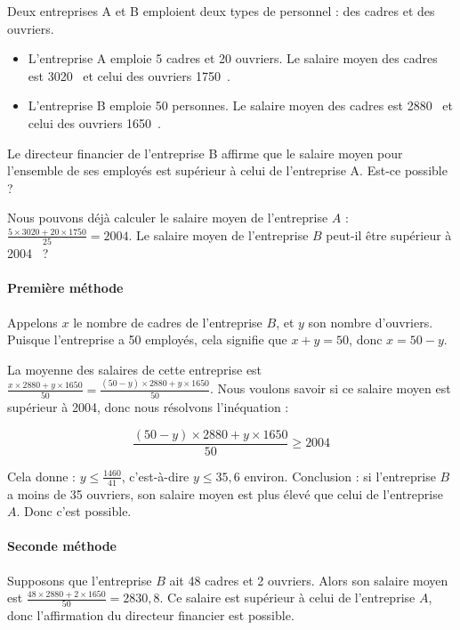 \documentclass[11pt]{article}
\begin{document}
\begin{exercice}
  \begin{em}
  Deux entreprises A et B emploient deux types de personnel : des cadres et des ouvriers. 
  \begin{itemize} 
    \item L'entreprise A emploie 5 cadres et 20 ouvriers. Le salaire moyen des cadres est 3020~\officialeuro{} et celui des ouvriers 1750~\officialeuro.
    \item  L'entreprise B emploie 50 personnes. Le salaire moyen des cadres est 2880~\officialeuro{} et celui des ouvriers 1650~\officialeuro.
  \end{itemize}
  Le directeur financier de l'entreprise B affirme que le salaire moyen pour l'ensemble de ses employés est supérieur à celui de l'entreprise A. Est-ce possible ? 
\end{em}

Nous pouvons déjà calculer le salaire moyen de l'entreprise $A$ : $\frac{5\times3020+20\times1750}{25}=2004$. Le salaire moyen de l'entreprise $B$ peut-il être supérieur à 2004~\officialeuro{} ?

\paragraph{Première méthode} Appelons $x$ le nombre de cadres de l'entreprise $B$, et $y$ son nombre d'ouvriers. Puisque l'entreprise a 50 employés, cela signifie que $x+y=50$, donc $x=50-y$.

\noindent La moyenne des salaires de cette entreprise est $\frac{x\times 2880+y\times 1650}{50}=\frac{(50-y)\times 2880+y\times 1650}{50}$. Nous voulons savoir si ce salaire moyen est supérieur à 2004, donc nous résolvons l'inéquation :

\[\frac{(50-y)\times 2880+y\times 1650}{50}\geq2004\]

Cela donne : $y\leq\frac{1460}{41}$, c'est-à-dire $y\leq35,6$ environ. Conclusion : si l'entreprise $B$ a moins de 35 ouvriers, son salaire moyen est plus élevé que celui de l'entreprise $A$. Donc c'est possible.

\paragraph{Seconde méthode} Supposons que l'entreprise $B$ ait 48 cadres et 2 ouvriers. Alors son salaire moyen est $\frac{48\times 2880+2\times 1650}{50}=2830,8$. Ce salaire est supérieur à celui de l'entreprise $A$, donc l'affirmation du directeur financier est possible.
\end{exercice}
\end{document}
